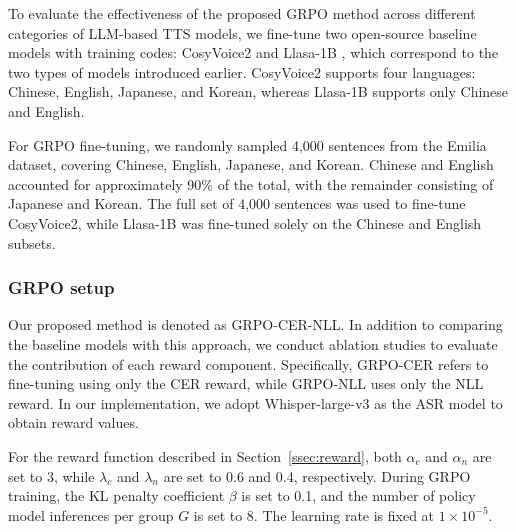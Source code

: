 \documentclass{article}
\begin{document}
To evaluate the effectiveness of the proposed GRPO method across different categories of LLM-based TTS models, we fine-tune two open-source baseline models with training codes: CosyVoice2 \cite{cosyvoice2} and Llasa-1B \cite{llasa}, which correspond to the two types of models introduced earlier. CosyVoice2 supports four languages: Chinese, English, Japanese, and Korean, whereas Llasa-1B supports only Chinese and English.

For GRPO fine-tuning, we randomly sampled 4,000 sentences from the Emilia dataset, covering Chinese, English, Japanese, and Korean. Chinese and English accounted for approximately 90\% of the total, with the remainder consisting of Japanese and Korean. The full set of 4,000 sentences was used to fine-tune CosyVoice2, while Llasa-1B was fine-tuned solely on the Chinese and English subsets.

\vspace{-0.4cm}
\subsubsection{GRPO setup}
\vspace{-0.2cm}

Our proposed method is denoted as GRPO-CER-NLL. In addition to comparing the baseline models with this approach, we conduct ablation studies to evaluate the contribution of each reward component. Specifically, GRPO-CER refers to fine-tuning using only the CER reward, while GRPO-NLL uses only the NLL reward. In our implementation, we adopt Whisper-large-v3 \cite{whisper} as the ASR model to obtain reward values.

For the reward function described in Section~\ref{ssec:reward}, both $\alpha_c$ and $\alpha_n$ are set to 3, while $\lambda_c$ and $\lambda_n$ are set to 0.6 and 0.4, respectively. During GRPO training, the KL penalty coefficient $\beta$ is set to 0.1, and the number of policy model inferences per group $G$ is set to 8. The learning rate is fixed at $1\times10^{-5}$.
\end{document}
